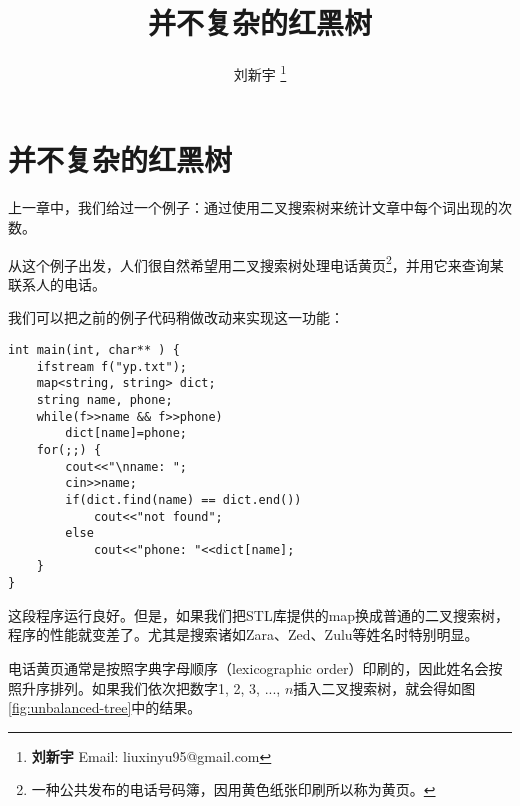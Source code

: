 \documentclass[UTF8]{article}
\begin{document}


\title{并不复杂的红黑树}

\author{刘新宇
\thanks{{\bfseries 刘新宇} \newline
  Email: liuxinyu95@gmail.com \newline}
  }

\maketitle
\fi


\ifx\wholebook\relax
\chapter{并不复杂的红黑树}
\fi

上一章中，我们给过一个例子：通过使用二叉搜索树来统计文章中每个词出现的次数。

从这个例子出发，人们很自然希望用二叉搜索树处理电话黄页\footnote{一种公共发布的电话号码簿，因用黄色纸张印刷所以称为黄页。}，并用它来查询某联系人的电话。

我们可以把之前的例子代码稍做改动来实现这一功能：

\begin{lstlisting}
int main(int, char** ) {
    ifstream f("yp.txt");
    map<string, string> dict;
    string name, phone;
    while(f>>name && f>>phone)
        dict[name]=phone;
    for(;;) {
        cout<<"\nname: ";
        cin>>name;
        if(dict.find(name) == dict.end())
            cout<<"not found";
        else
            cout<<"phone: "<<dict[name];
    }
}
\end{lstlisting}

这段程序运行良好。但是，如果我们把STL库提供的map换成普通的二叉搜索树，程序的性能就变差了。尤其是搜索诸如Zara、Zed、Zulu等姓名时特别明显。

电话黄页通常是按照字典字母顺序（lexicographic order）印刷的，因此姓名会按照升序排列。如果我们依次把数字1, 2, 3, ..., $n$插入二叉搜索树，就会得如图\ref{fig:unbalanced-tree}中的结果。
\end{document}
